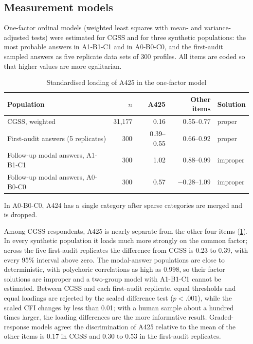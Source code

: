 \documentclass[11pt]{article}
\begin{document}
\subsection{Measurement models}

One-factor ordinal models (weighted least squares with mean- and variance-adjusted tests) were estimated for CGSS and for three synthetic populations: the most probable answers in A1-B1-C1 and in A0-B0-C0, and the first-audit sampled answers as five replicate data sets of 300 profiles. All items are coded so that higher values are more egalitarian.

\begin{table}[H]
\centering
\caption{Standardised loading of A425 in the one-factor model}
\label{tab:cfa}
\small
\begin{tabular}{lrrrl}
\toprule
Population & $n$ & A425 & Other items & Solution \\
\midrule
CGSS, weighted & 31,177 & 0.16 & 0.55--0.77 & proper \\
First-audit answers (5 replicates) & 300 & 0.39--0.55 & 0.66--0.92 & proper \\
Follow-up modal answers, A1-B1-C1 & 300 & 1.02 & 0.88--0.99 & improper \\
Follow-up modal answers, A0-B0-C0 & 300 & 0.57 & $-0.28$--1.09 & improper \\
\bottomrule
\end{tabular}
\begin{tablenotes}\footnotesize
\item In A0-B0-C0, A424 has a single category after sparse categories are merged and is dropped.
\end{tablenotes}
\end{table}

Among CGSS respondents, A425 is nearly separate from the other four items (\cref{tab:cfa}). In every synthetic population it loads much more strongly on the common factor; across the five first-audit replicates the difference from CGSS is 0.23 to 0.39, with every 95\% interval above zero. The modal-answer populations are close to deterministic, with polychoric correlations as high as 0.998, so their factor solutions are improper and a two-group model with A1-B1-C1 cannot be estimated. Between CGSS and each first-audit replicate, equal thresholds and equal loadings are rejected by the scaled difference test ($p<.001$), while the scaled CFI changes by less than 0.01; with a human sample about a hundred times larger, the loading differences are the more informative result. Graded-response models agree: the discrimination of A425 relative to the mean of the other items is 0.17 in CGSS and 0.30 to 0.53 in the first-audit replicates.
\end{document}
